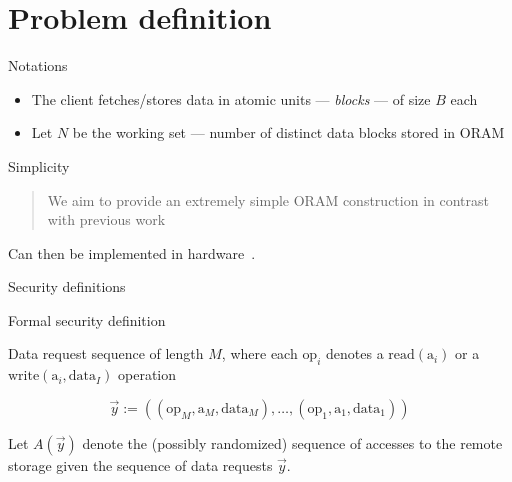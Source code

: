 
\section{Problem definition}

	\begin{frame}{Notations}
		
		\begin{itemize}
			\item 
				The client fetches/stores data in atomic units --- \emph{blocks} --- of size $B$ each
			\item 
				Let $N$ be the working set --- number of distinct data blocks stored in ORAM
		\end{itemize}

	\end{frame}

	\begin{frame}{Simplicity}
		
		\begin{quote}
			We aim to provide an extremely simple ORAM construction in contrast with previous work
		\end{quote}
		
		Can then be implemented in hardware~\cite{Maas:EECS-2014-89}.

	\end{frame}

	\begin{frame}{Security definitions}
		
		\begin{block}{Formal security definition}
			
			Data request sequence of length $M$, where each $\text{op}_i$ denotes a $\text{read}(\text{a}_i)$ or a $\text{write}(\text{a}_i, \text{data}_I)$ operation
			
			\[
				\vec{y} := ( (\text{op}_M, \text{a}_M, \text{data}_M), \ldots , (\text{op}_1, \text{a}_1, \text{data}_1) )
			\]

			Let $A(\vec{y})$ denote the (possibly randomized) sequence of accesses to the remote storage given the sequence of data requests $\vec{y}$.

		\end{block}

	\end{frame}

